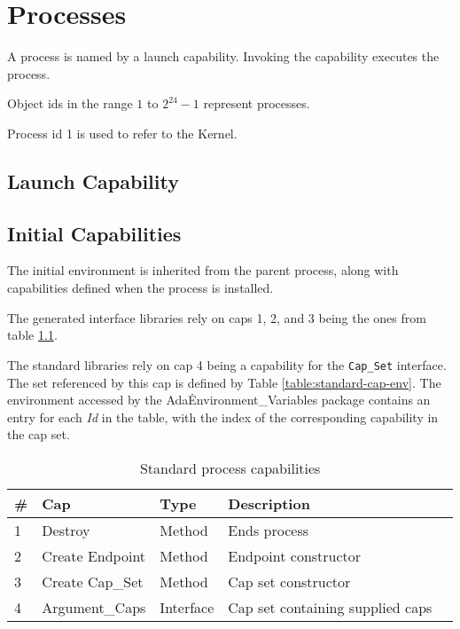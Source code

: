 \chapter{Processes}

A process is named by a launch capability.  Invoking the capability executes the process.

Object ids in the range $1$ to $2^{24} - 1$ represent processes.

Process id 1 is used to refer to the Kernel.

\section{Launch Capability}

\section{Initial Capabilities}

The initial environment is inherited from the parent process, along with capabilities defined when the process is installed.

The generated interface libraries rely on caps 1, 2, and 3 being the ones from table \ref{table:standard-caps}.

The standard libraries rely on cap 4 being a capability for the {\tt Cap\_Set} interface.
The set referenced by this cap is defined by Table \ref{table:standard-cap-env}.
The environment accessed by the Ada\.Environment\_Variables package contains an entry for each {\em Id} in the table, with the index of the corresponding capability in the cap set.

\begin{table}[ht]
\begin{tabular}{l l l l l}
\hline\hline
\# & Cap & Type & Description \\
\hline
1 & Destroy & Method & Ends process \\
2 & Create Endpoint & Method & Endpoint constructor \\
3 & Create Cap\_Set & Method & Cap set constructor \\
4 & Argument\_Caps & Interface & Cap set containing supplied caps \\
\hline
\end{tabular}
\caption{Standard process capabilities}
\label{table:standard-caps}
\end{table}

